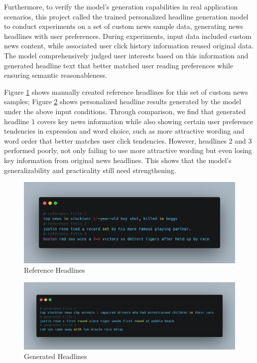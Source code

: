 \documentclass[10pt,a4paper]{article}
\begin{document}
Furthermore, to verify the model's generation capabilities in real application scenarios, this project called the trained personalized headline generation model to conduct experiments on a set of custom news sample data, generating news headlines with user preferences. During experiments, input data included custom news content, while associated user click history information reused original data. The model comprehensively judged user interests based on this information and generated headline text that better matched user reading preferences while ensuring semantic reasonableness.

Figure \ref{fig:ref} shows manually created reference headlines for this set of custom news samples; Figure \ref{fig:gen} shows personalized headline results generated by the model under the above input conditions. Through comparison, we find that generated headline 1 covers key news information while also showing certain user preference tendencies in expression and word choice, such as more attractive wording and word order that better matches user click tendencies. However, headlines 2 and 3 performed poorly, not only failing to use more attractive wording but even losing key information from original news headlines. This shows that the model's generalizability and practicality still need strengthening.

\begin{figure}[H]
  \centering
  \includegraphics[width=15cm]{fig/reference.png}
  \caption{Reference Headlines}\label{fig:ref}
\end{figure}
\begin{figure}[H]
  \centering
  \includegraphics[width=15cm]{fig/generated.png}
  \caption{Generated Headlines}\label{fig:gen}
\end{figure}
\end{document}
